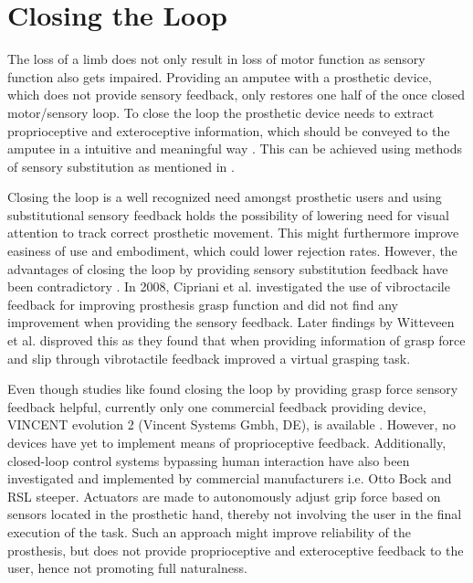 \section{Closing the Loop}

The loss of a limb does not only result in loss of motor function as sensory function also gets impaired. Providing an amputee with a prosthetic device, which does not provide sensory feedback, only restores one half of the once closed motor/sensory loop. To close the loop the prosthetic device needs to extract proprioceptive and exteroceptive information, which should be conveyed to the amputee in a intuitive and meaningful way \cite{Markovic2018}. This can be achieved using methods of sensory substitution as mentioned in . 

Closing the loop is a well recognized need amongst prosthetic users and using substitutional sensory feedback holds the possibility of lowering need for visual attention to track correct prosthetic movement. This might furthermore improve easiness of use and embodiment, which could lower rejection rates. \cite{Strbac2016} However, the advantages of closing the loop by providing sensory substitution feedback have been contradictory \cite{Jorgovanovic2014}. In 2008, Cipriani et al. \cite{Cipriani2008} investigated the use of vibroctacile feedback for improving prosthesis grasp function and did not find any improvement when providing the sensory feedback. Later findings by Witteveen et al. \cite{Witteveen2012} disproved this as they found that when providing information of grasp force and slip through vibrotactile feedback improved a virtual grasping task. 

Even though studies like \cite{Jorgovanovic2014,Witteveen2012} found closing the loop by providing grasp force sensory feedback helpful, currently only one commercial feedback providing device, VINCENT evolution 2 (Vincent Systems Gmbh, DE), is available \cite{Systems2005}. However, no devices have yet to implement means of proprioceptive feedback. Additionally, closed-loop control systems bypassing human interaction have also been investigated and implemented by commercial manufacturers i.e. Otto Bock and RSL steeper. Actuators are made to autonomously adjust grip force based on sensors located in the prosthetic hand, thereby not involving the user in the final execution of the task. \cite{Xu2016} Such an approach might improve reliability of the prosthesis, but does not provide proprioceptive and exteroceptive feedback to the user, hence not promoting full naturalness.  




